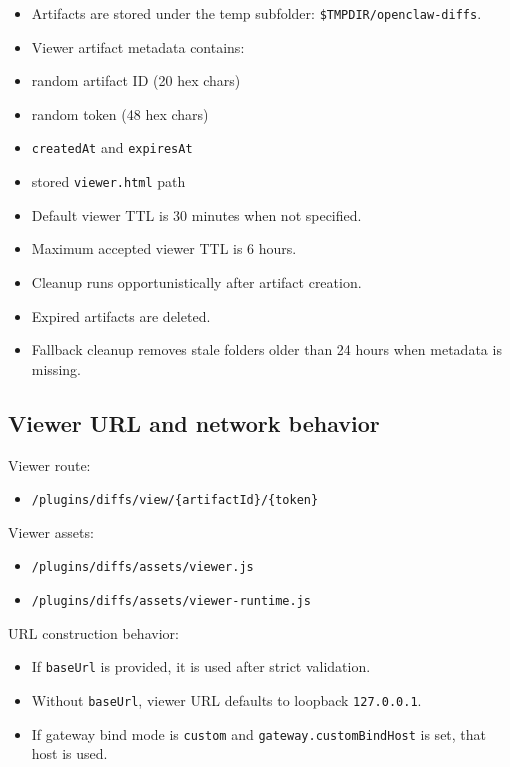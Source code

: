 \begin{itemize}
  \item Artifacts are stored under the temp subfolder: \texttt{\$TMPDIR/openclaw-diffs}.
  \item Viewer artifact metadata contains:
  \item random artifact ID (20 hex chars)
  \item random token (48 hex chars)
  \item \texttt{createdAt} and \texttt{expiresAt}
  \item stored \texttt{viewer.html} path
  \item Default viewer TTL is 30 minutes when not specified.
  \item Maximum accepted viewer TTL is 6 hours.
  \item Cleanup runs opportunistically after artifact creation.
  \item Expired artifacts are deleted.
  \item Fallback cleanup removes stale folders older than 24 hours when metadata is missing.
\end{itemize}


\subsection{Viewer URL and network behavior}


Viewer route:

\begin{itemize}
  \item \texttt{/plugins/diffs/view/\{artifactId\}/\{token\}}
\end{itemize}


Viewer assets:

\begin{itemize}
  \item \texttt{/plugins/diffs/assets/viewer.js}
  \item \texttt{/plugins/diffs/assets/viewer-runtime.js}
\end{itemize}


URL construction behavior:

\begin{itemize}
  \item If \texttt{baseUrl} is provided, it is used after strict validation.
  \item Without \texttt{baseUrl}, viewer URL defaults to loopback \texttt{127.0.0.1}.
  \item If gateway bind mode is \texttt{custom} and \texttt{gateway.customBindHost} is set, that host is used.
\end{itemize}


